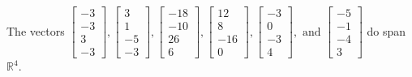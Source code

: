 \begin{exercise}
\begin{exerciseStatement}
  \end{exerciseStatement}
  \begin{exerciseAnswer}
   The vectors \(\left[\begin{array}{r}
-3 \\
-3 \\
3 \\
-3
\end{array}\right] , \left[\begin{array}{r}
3 \\
1 \\
-5 \\
-3
\end{array}\right] , \left[\begin{array}{r}
-18 \\
-10 \\
26 \\
6
\end{array}\right] , \left[\begin{array}{r}
12 \\
8 \\
-16 \\
0
\end{array}\right] , \left[\begin{array}{r}
-3 \\
0 \\
-3 \\
4
\end{array}\right] , \text{ and } \left[\begin{array}{r}
-5 \\
-1 \\
-4 \\
3
\end{array}\right]\) 
  	 do  
	span \(\mathbb{R}^4\).
  


  \end{exerciseAnswer}
\end{exercise}
